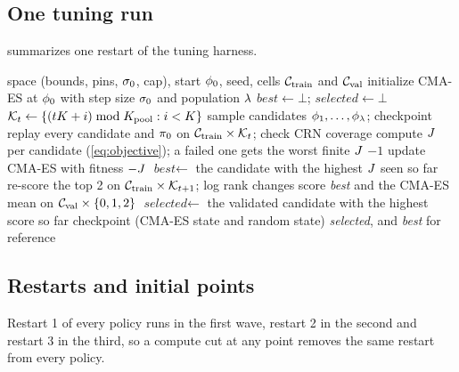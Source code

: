 \subsection{One tuning run}

 summarizes one restart of the tuning harness.

\begin{algorithm}[tbp]
\caption{Tuning one policy (one restart of the tuning harness). Every policy, learned or baseline,
  runs this with the same $\budget$, $\popsize$, $\Krep$, cells, validation schedule and selection
  rule.}
\label{alg:train}
\begin{algorithmic}[1]
\Require space (bounds, pins, $\sigma_{0}$, cap), start $\phi_0$, seed, cells $\mathcal{C}_{\mathrm{train}}$
  and $\mathcal{C}_{\mathrm{val}}$
\State initialize CMA-ES at $\phi_0$ with step size $\sigma_{0}$ and population $\popsize$
\State $\textit{best} \gets \bot$; \quad $\textit{selected} \gets \bot$
  \State $\mathcal{K}_{t} \gets \{(tK + i) \bmod K_{\mathrm{pool}} : i < K\}$
  \State sample candidates $\phi_1,\dots,\phi_{\lambda}$; checkpoint 
  \State replay every candidate and $\pi_{0}$ on $\mathcal{C}_{\mathrm{train}} \times \mathcal{K}_{t}$; check CRN coverage
  \State compute $J$ per candidate (\cref{eq:objective}); a failed one gets the worst finite $J$ $-1$
  \State update CMA-ES with fitness $-J$ 
  \State $\textit{best} \gets$ the candidate with the highest $J$ seen so far
  \State re-score the top 2 on $\mathcal{C}_{\mathrm{train}} \times \mathcal{K}_{t+1}$; log rank changes 
    \State score \textit{best} and the CMA-ES mean on $\mathcal{C}_{\mathrm{val}} \times \{0,1,2\}$
    \State $\textit{selected} \gets$ the validated candidate with the highest score so far
  \EndIf
  \State checkpoint (CMA-ES state and random state)
\EndFor
\State \Return \textit{selected}, and \textit{best} for reference
\end{algorithmic}
\end{algorithm}

\subsection{Restarts and initial points}
\label{app:starts}

Restart 1 of every policy runs in the first wave, restart 2 in the second and restart 3 in the
third, so a compute cut at any point removes the same restart from every policy.

